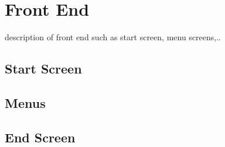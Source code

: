 \chapter{Front End}
description of front end such as start screen, menu screens,..  

\section{Start Screen}

\section{Menus}

\section{End Screen}
